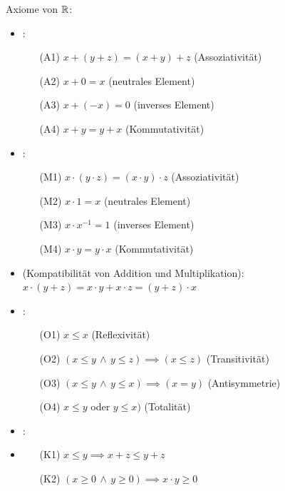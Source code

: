 \Def Axiome von $\mathbb{R}$:
\vspace{-0.6em}
\begin{itemize}
    \item {}:
    \begin{itemize}
        \item[(A1)] $x + (y + z) = (x + y) + z$ (Assoziativität)
        \item[(A2)] $x + 0 = x$ (neutrales Element)
        \item[(A3)] $x + (-x) = 0$ (inverses Element)
        \item[(A4)] $x + y = y + x$ (Kommutativität) 
    \end{itemize}

    \item {}:
    \begin{itemize}
        \item[(M1)] $x \cdot (y \cdot z) = (x \cdot y) \cdot z$ (Assoziativität)
        \item[(M2)] $x \cdot 1 = x$ (neutrales Element)
        \item[(M3)] $x \cdot x^{-1} = 1$ (inverses Element)
        \item[(M4)] $x \cdot y = y \cdot x$ (Kommutativität)
    \end{itemize}
    
    \item {} (Kompatibilität von Addition und Multiplikation):
        $x \cdot (y + z) = x \cdot y + x \cdot z = (y + z) \cdot x$
    
    \item {}:
    \begin{itemize}
        \item[(O1)] $x\le x$ (Reflexivität)
        \item[(O2)] $(x\le y \, \land \, y\le z) \implies (x\le z)$ (Transitivität)
        \item[(O3)] $(x\le y \, \land \, y\le x) \implies (x = y)$ (Antisymmetrie)
        \item[(O4)] $x\le y$ oder $y\le x)$ (Totalität)
    \end{itemize}

    \item {}:
    \item \begin{itemize}
        \item[(K1)] $x\le y \implies x + z\le y + z$
        \item[(K2)] $(x\ge 0 \, \land \, y\ge 0) \implies x \cdot y\ge 0$
    \end{itemize}
\end{itemize}

